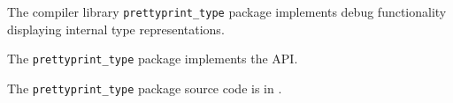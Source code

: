 
The compiler library {\tt prettyprint\_type} package implements debug functionality displaying internal type representations.

The {\tt prettyprint\_type} package implements the  API.

The {\tt prettyprint\_type} package source code is in .




